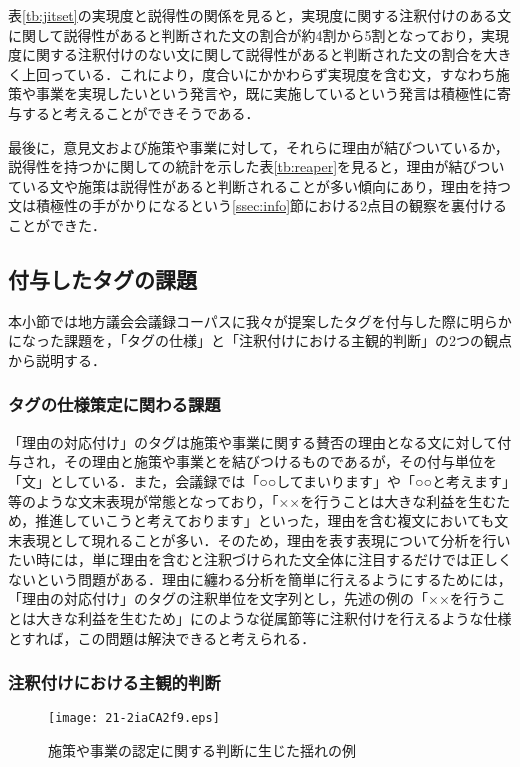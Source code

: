\documentclass[japanese]{jnlp_1.4}
\begin{document}
表\ref{tb:jitset}の実現度と説得性の関係を見ると，実現度に関する注釈付けのある文に関して説得性があると判断された文の割合が約4割から5割となっており，実現度に関する注釈付けのない文に関して説得性があると判断された文の割合を大きく上回っている．これにより，度合いにかかわらず実現度を含む文，すなわち施策や事業を実現したいという発言や，既に実施しているという発言は積極性に寄与すると考えることができそうである．

最後に，意見文および施策や事業に対して，それらに理由が結びついているか，説得性を持つかに関しての統計を示した表\ref{tb:reaper}を見ると，理由が結びついている文や施策は説得性があると判断されることが多い傾向にあり，理由を持つ文は積極性の手がかりになるという\ref{ssec:info}節における2点目の観察を裏付けることができた．


\subsection{付与したタグの課題}
\label{ssec:mondai}

本小節では地方議会会議録コーパスに我々が提案したタグを付与した際に明らかになった課題を，「タグの仕様」と「注釈付けにおける主観的判断」の2つの観点から説明する．


\subsubsection{タグの仕様策定に関わる課題}

「理由の対応付け」のタグは施策や事業に関する賛否の理由となる文に対して付与され，その理由と施策や事業とを結びつけるものであるが，その付与単位を「文」としている．また，会議録では「○○してまいります」や「○○と考えます」等のような文末表現が常態となっており，「××を行うことは大きな利益を生むため，推進していこうと考えております」といった，理由を含む複文においても文末表現として現れることが多い．そのため，理由を表す表現について分析を行いたい時には，単に理由を含むと注釈づけられた文全体に注目するだけでは正しくないという問題がある．理由に纏わる分析を簡単に行えるようにするためには，「理由の対応付け」のタグの注釈単位を文字列とし，先述の例の「××を行うことは大きな利益を生むため」にのような従属節等に注釈付けを行えるような仕様とすれば，この問題は解決できると考えられる．


\subsubsection{注釈付けにおける主観的判断}

\begin{figure}[b]
 \begin{center}
 \texttt{[image: 21-2iaCA2f9.eps]}
 \end{center}
\caption{施策や事業の認定に関する判断に生じた揺れの例}
\label{fig:yure}
\end{figure}
\end{document}
